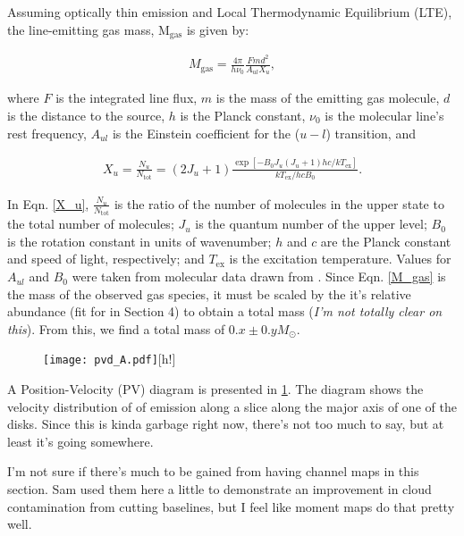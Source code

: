\bigskip

Assuming optically thin emission and Local Thermodynamic Equilibrium (LTE), the line-emitting gas mass, M$_{\text{gas}}$ is given by:

\begin{align}
  M_{\text{gas}}= \frac{4 \pi}{h \nu_0} \frac{F m d^2}{A_{ul} X_u},
  \label{M_gas}
\end{align}

where $F$ is the integrated line flux, $m$ is the mass of the emitting gas molecule, $d$ is the distance to the source, $h$ is the Planck constant, $\nu_0$ is the molecular line's rest frequency, $A_{ul}$ is the Einstein coefficient for the ($u - l$) transition, and

\begin{align}
  X_u = \frac{N_u}{N_{\text{tot}}} = (2 J_u + 1) \frac{\exp [-B_0 J_u (J_u + 1) h c/kT_{\text{ex}}]}{kT_{\text{ex}}/hc B_0}.
  \label{X_u}
\end{align}

In Eqn. \ref{X_u}, $\frac{N_u}{N_{\text{tot}}}$ is the ratio of the number of molecules in the upper state to the total number of molecules; $J_u$ is the quantum number of the upper level; $B_0$ is the rotation constant in units of wavenumber; $h$ and $c$ are the Planck constant and speed of light, respectively; and $T_{\text{ex}}$ is the excitation temperature. Values for $A_{ul}$ and $B_0$ were taken from molecular data drawn from \citet{Schoeier2005}. Since Eqn. \ref{M_gas} is the mass of the observed gas species, it must be scaled by the it's relative abundance (fit for in Section 4) to obtain a total mass (\textit{I'm not totally clear on this}). From this, we find a total mass of $0.x \pm 0.y M_{\odot}$.



\begin{figure}
\centering
\texttt{[image: pvd\_A.pdf]}[h!]
  \label{fig:pv_diag}
\end{figure}

A Position-Velocity (PV) diagram is presented in \ref{fig:pv_diag}. The diagram shows the velocity distribution of of emission along a slice along the major axis of one of the disks. Since this is kinda garbage right now, there's not too much to say, but at least it's going somewhere.



I'm not sure if there's much to be gained from having channel maps in this section. Sam used them here a little to demonstrate an improvement in cloud contamination from cutting baselines, but I feel like moment maps do that pretty well.

